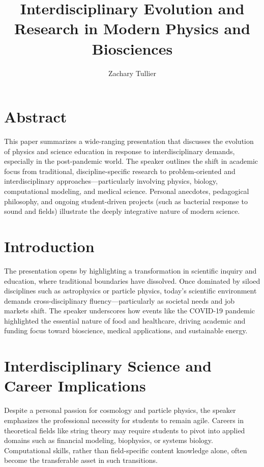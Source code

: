 \documentclass[12pt]{article}
\begin{document}
\singlespacing  %
\title{Interdisciplinary Evolution and Research in Modern Physics and Biosciences}

\author[1]{Zachary Tullier}
\date{}
\maketitle

\section*{Abstract}
This paper summarizes a wide-ranging presentation that discusses the evolution of physics and science education in response to interdisciplinary demands, especially in the post-pandemic world. The speaker outlines the shift in academic focus from traditional, discipline-specific research to problem-oriented and interdisciplinary approaches---particularly involving physics, biology, computational modeling, and medical science. Personal anecdotes, pedagogical philosophy, and ongoing student-driven projects (such as bacterial response to sound and fields) illustrate the deeply integrative nature of modern science.

\section*{Introduction}
The presentation opens by highlighting a transformation in scientific inquiry and education, where traditional boundaries have dissolved. Once dominated by siloed disciplines such as astrophysics or particle physics, today's scientific environment demands cross-disciplinary fluency---particularly as societal needs and job markets shift. The speaker underscores how events like the COVID-19 pandemic highlighted the essential nature of food and healthcare, driving academic and funding focus toward bioscience, medical applications, and sustainable energy.

\section*{Interdisciplinary Science and Career Implications}
Despite a personal passion for cosmology and particle physics, the speaker emphasizes the professional necessity for students to remain agile. Careers in theoretical fields like string theory may require students to pivot into applied domains such as financial modeling, biophysics, or systems biology. Computational skills, rather than field-specific content knowledge alone, often become the transferable asset in such transitions.
\end{document}
